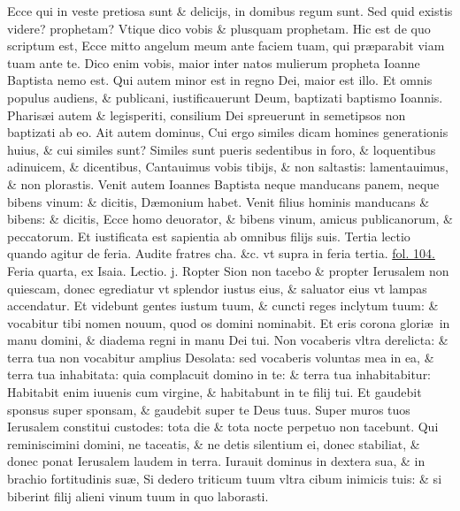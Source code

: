 \documentclass[a5paper,10pt]{book}
\def\rightmarginnote{%
	\lrmarginnote{\hskip\columnwidth \hskip -1em}}
\def\ae{æ}
\begin{document}
\begin{multicols*}{2}
Ecce qui in veste pretiosa sunt \& delicijs, in domibus regum sunt. Sed quid existis videre? prophetam?
Vtique dico vobis \& plusquam prophetam.
Hic est de quo scriptum est, Ecce mitto angelum meum ante faciem tuam, qui pr\ae parabit viam tuam ante te.
Dico enim vobis, maior inter natos mulierum propheta Ioanne Baptista nemo est.
Qui autem minor est in regno Dei, maior est illo.
Et omnis populus audiens, \& publicani, iustificauerunt Deum, baptizati baptismo Ioannis.
Pharis\ae i autem \& legisperiti, consilium Dei spreuerunt in semetipsos non baptizati ab eo.
Ait autem dominus, Cui ergo similes dicam homines generationis huius, \& cui similes sunt?
Similes sunt pueris sedentibus in foro, \& loquentibus adinuicem, \& dicentibus, Cantauimus vobis tibijs, \& non saltastis: lamentauimus, \& non plorastis.
Venit autem Ioannes Baptista neque manducans panem, neque bibens vinum: \& dicitis, D\ae monium habet.
Venit filius hominis manducans \& bibens: \& dicitis, Ecce homo deuorator, \& bibens vinum, amicus publicanorum, \& peccatorum.
Et iustificata est sapientia ab omnibus filijs suis.
\newline \color{red} Tertia lectio quando agitur de feria. \color{black} Audite fratres cha. \&c. \color{red} vt supra in feria tertia. \hyperlink{page.104}{fol. 104.} \color{black}
\newline {} \color{red} \hypertarget{WED-TERTIA-ADV}{Feria quarta,} ex Isaia. \hfill Lectio. j. \color{black}
\vspace{-.25em}
Ropter\rightmarginnote{c. 62.} Sion non tacebo \& propter Ierusalem non quiescam, donec egrediatur vt splendor
iustus eius, \& saluator eius vt lampas accendatur.
Et videbunt gentes iustum tuum, \& cuncti reges inclytum tuum: \& vocabitur tibi nomen nouum, quod os domini nominabit.
Et eris corona glori\ae \ in manu domini, \& diadema regni in manu Dei tui.
Non vocaberis vltra derelicta: \& terra tua non vocabitur amplius Desolata: sed vocaberis voluntas mea in ea, \& terra tua inhabitata: quia complacuit domino in te: \& terra tua inhabitabitur: Habitabit enim iuuenis cum virgine, \& habitabunt in te filij tui.
Et gaudebit sponsus super sponsam, \& gaudebit super te Deus tuus.
Super muros tuos Ierusalem constitui custodes: tota die \& tota nocte perpetuo non tacebunt.
Qui reminiscimini domini, ne taceatis, \& ne detis silentium ei, donec stabiliat, \& donec ponat Ierusalem laudem in terra.
Iurauit dominus in dextera sua, \& in brachio fortitudinis su\ae , Si dedero triticum tuum vltra cibum inimicis tuis: \& si biberint filij alieni vinum tuum in quo laborasti.

\end{multicols*}
\end{document}
